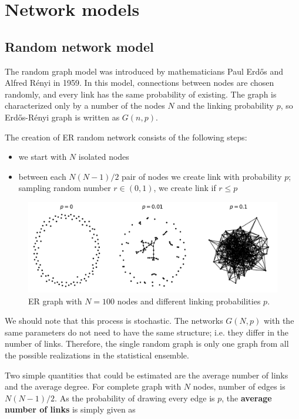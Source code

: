 \section{Network models}

\subsection{Random network model}

The random graph model was introduced by mathematicians Paul Erdős and Alfred R\' {e}nyi in 1959. In this model, connections between nodes are chosen randomly, and every link has the same probability of existing. The graph is characterized only by a number of the nodes $N$ and the linking probability $p$, so Erdős-R\' {e}nyi graph is written as $G(n, p)$. 

The creation of ER random network consists of the following steps:
\begin{itemize}
	\item we start with $N$ isolated nodes
	\item between each $N(N-1)/2$ pair of nodes we create link with probability $p$; sampling random number $r \in (0,1)$, we create link if $r \leq p$    
\end{itemize}


\begin{figure}[!ht]
	\centering
	\includegraphics[width=0.9\linewidth]{figures/methodology/ERgraph}
	\caption{ER graph with $N=100$ nodes and different linking probabilities $p$.}
	\label{fig:erp}
\end{figure}

We should note that this process is stochastic. The networks $G(N, p)$ with the same parameters do not need to have the same structure; i.e. they differ in the number of links. Therefore, the single random graph is only one graph from all the possible realizations in the statistical ensemble. 

Two simple quantities that could be estimated are the average number of links and the average degree. For complete graph with $N$ nodes, number of edges is $N(N-1)/2$. As the probability of drawing every edge is $p$, the \textbf{average number of links} is simply given as 

